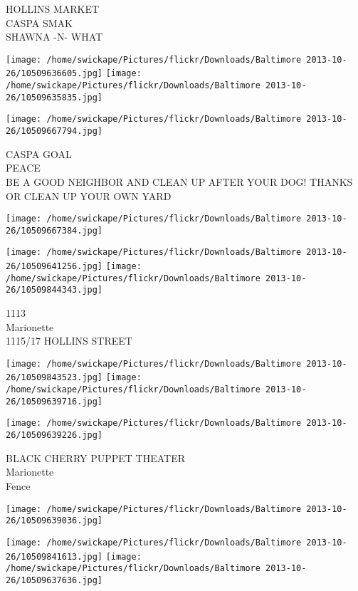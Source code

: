 \documentclass[10pt,letterpaper]{article}
\begin{document}
HOLLINS MARKET\\
CASPA SMAK\\
SHAWNA {-}N{-} WHAT\\
\pagebreak

\texttt{[image: /home/swickape/Pictures/flickr/Downloads/Baltimore 2013-10-26/10509636605.jpg]}
\texttt{[image: /home/swickape/Pictures/flickr/Downloads/Baltimore 2013-10-26/10509635835.jpg]}

\texttt{[image: /home/swickape/Pictures/flickr/Downloads/Baltimore 2013-10-26/10509667794.jpg]}

CASPA GOAL\\
PEACE\\
BE A GOOD NEIGHBOR AND CLEAN UP AFTER YOUR DOG! THANKS OR CLEAN UP YOUR OWN YARD\\
\pagebreak

\texttt{[image: /home/swickape/Pictures/flickr/Downloads/Baltimore 2013-10-26/10509667384.jpg]}

\vspace{0.25in}
\texttt{[image: /home/swickape/Pictures/flickr/Downloads/Baltimore 2013-10-26/10509641256.jpg]}
\texttt{[image: /home/swickape/Pictures/flickr/Downloads/Baltimore 2013-10-26/10509844343.jpg]}

1113\\
Marionette\\
1115/17 HOLLINS STREET\\
\pagebreak

\texttt{[image: /home/swickape/Pictures/flickr/Downloads/Baltimore 2013-10-26/10509843523.jpg]}
\texttt{[image: /home/swickape/Pictures/flickr/Downloads/Baltimore 2013-10-26/10509639716.jpg]}

\vspace{0.25in}
\texttt{[image: /home/swickape/Pictures/flickr/Downloads/Baltimore 2013-10-26/10509639226.jpg]}

BLACK CHERRY PUPPET THEATER\\
Marionette\\
Fence\\
\pagebreak

\texttt{[image: /home/swickape/Pictures/flickr/Downloads/Baltimore 2013-10-26/10509639036.jpg]}

\vspace{0.25in}
\texttt{[image: /home/swickape/Pictures/flickr/Downloads/Baltimore 2013-10-26/10509841613.jpg]}
\texttt{[image: /home/swickape/Pictures/flickr/Downloads/Baltimore 2013-10-26/10509637636.jpg]}
\end{document}
